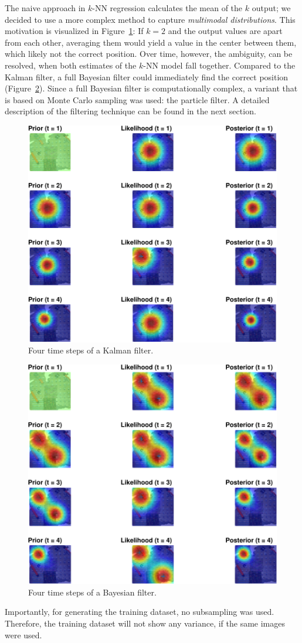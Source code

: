 \documentclass{report}
\begin{document}
The naive approach in $k$-NN regression calculates the mean of the $k$
output; we decided to use a more complex method to capture
\emph{multimodal distributions}. This motivation is visualized in
Figure~\ref{fig:Kalman}: If $k=2$ and the output values are apart from
each other, averaging them would yield a value in the center between
them, which likely not the correct position. Over time, however, the
ambiguity, can be resolved, when both estimates of the $k$-NN model
fall together. Compared to the Kalman filter, a full Bayesian filter
could immediately find the correct position
(Figure~\ref{fig:bayesianfilter}). Since a full Bayesian filter is
computationally complex, a variant that is based on Monte Carlo
sampling was used: the particle filter. A detailed description of the
filtering technique can be found in the next section.
\begin{figure}[t]
\label{fig:Kalman}
\begin{center}
\includegraphics[width=0.7\columnwidth]{kalman-crop}
\caption{ Four time steps of a Kalman filter.%
}
\end{center}
\end{figure}
\begin{figure}[t]
\label{fig:bayesianfilter}
\begin{center}
\includegraphics[width=0.7\columnwidth]{particle-crop}
\caption{ Four time steps of a Bayesian filter.}
\end{center}
\end{figure}
Importantly, for generating the training dataset, no subsampling was
used. Therefore, the training dataset will not show any variance, if
the same images were used.
\end{document}
